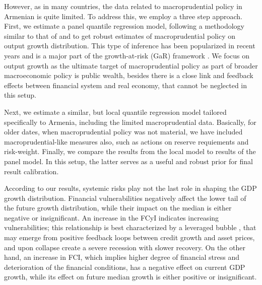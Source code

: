 \documentclass[12pt,a4paper]{article}
\begin{document}
However, as in many countries, the data related to macroprudential policy in Armenian is quite limited. To address this, we employ a three step approach. First, we estimate a panel quantile regression model, following a methodology similar to that of \citet{galan2020} and \citet{aikman2019} to get robust estimates of macroprudential policy on output growth distribution. This type of inference has been popularized in recent years and is a major part of the growth-at-risk (GaR) framework \citep{esrb2024}. We focus on output growth as the ultimate target of macroprudential policy as part of broader macroeconomic policy is public wealth, besides there is a close link and feedback effects between financial system and real economy, that cannot be neglected in this setup.

Next, we estimate a similar, but local quantile regression model tailored specifically to Armenia, including the limited macroprudential data. Basically, for older dates, when macroprudential policy was not material, we have included macroprudential-like measures also, such as actions on reserve requiements and risk-weight. Finally, we compare the results from the local model  to results of the panel model. In this setup, the latter serves as a useful and robust prior for final result calibration.

According to our results, systemic risks play not the last role in shaping the GDP growth distribution. Financial vulnerabilities negatively affect the lower tail of the future growth distribution, while their impact on the median is either negative or insignificant. An increase in the FCyI indicates increasing vulnerabilities; this relationship is best characterized by a leveraged bubble \citep{jorda2015}, that may emerge from positive feedback loops between credit growth and asset prices, and upon collapse create a severe recession with slower recovery. On the other hand, an increase in FCI, which implies higher degree of financial stress and deterioration of the financial conditions, has a negative effect on current GDP growth, while its effect on future median growth is either positive or insignificant.
\end{document}
